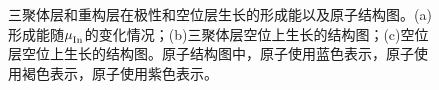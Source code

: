 \begin{figure}[!htb]
    \begin{minipage}[b]{0.4\textwidth}
        \newline
    \end{minipage}
    \caption{三聚体层和重构层在极性和空位层生长的形成能以及原子结构图。(a)形成能随$\it \mu_{\rm In}^{\rm } \it$的变化情况；(b)三聚体层空位上生长的结构图；(c)空位层空位上生长的结构图。原子结构图中，原子使用蓝色表示，原子使用褐色表示，原子使用紫色表示。}
    \label{fig:IS_2Linsb_InVfirstlayer}
\end{figure}

